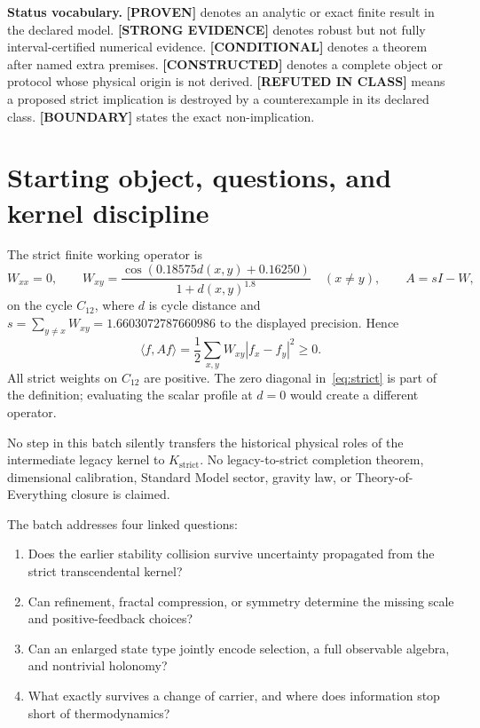 \documentclass[11pt,a4paper]{article}
\newcommand{\proven}{\textcolor{green!40!black}{\textbf{[PROVEN]}}}
\newcommand{\strong}{\textcolor{blue!70!black}{\textbf{[STRONG EVIDENCE]}}}
\newcommand{\conditional}{\textcolor{black!60}{\textbf{[CONDITIONAL]}}}
\newcommand{\constructed}{\textcolor{violet!70!black}{\textbf{[CONSTRUCTED]}}}
\newcommand{\failed}{\textcolor{red!72!black}{\textbf{[REFUTED IN CLASS]}}}
\newcommand{\statusboundary}{\textcolor{orange!80!black}{\textbf{[BOUNDARY]}}}
\begin{document}
\textbf{Status vocabulary.} \proven{} denotes an analytic or exact finite result in the declared model. \strong{} denotes robust but not fully interval-certified numerical evidence. \conditional{} denotes a theorem after named extra premises. \constructed{} denotes a complete object or protocol whose physical origin is not derived. \failed{} means a proposed strict implication is destroyed by a counterexample in its declared class. \statusboundary{} states the exact non-implication.

\tableofcontents
\newpage

\section{Starting object, questions, and kernel discipline}

The strict finite working operator is
\begin{equation}
W_{xx}=0,\qquad
W_{xy}=\frac{\cos(0.18575d(x,y)+0.16250)}{1+d(x,y)^{1.8}}\quad(x\ne y),
\qquad A=sI-W,
\label{eq:strict}
\end{equation}
on the cycle $C_{12}$, where $d$ is cycle distance and $s=\sum_{y\ne x}W_{xy}=1.6603072787660986$ to the displayed precision. Hence
\[
\langle f,Af\rangle=\frac12\sum_{x,y}W_{xy}|f_x-f_y|^2\ge0.
\]
All strict weights on $C_{12}$ are positive. The zero diagonal in~\eqref{eq:strict} is part of the definition; evaluating the scalar profile at $d=0$ would create a different operator.

No step in this batch silently transfers the historical physical roles of the intermediate legacy kernel to $K_{\mathrm{strict}}$. No legacy-to-strict completion theorem, dimensional calibration, Standard Model sector, gravity law, or Theory-of-Everything closure is claimed.

The batch addresses four linked questions:
\begin{enumerate}
\item Does the earlier stability collision survive uncertainty propagated from the strict transcendental kernel?
\item Can refinement, fractal compression, or symmetry determine the missing scale and positive-feedback choices?
\item Can an enlarged state type jointly encode selection, a full observable algebra, and nontrivial holonomy?
\item What exactly survives a change of carrier, and where does information stop short of thermodynamics?
\end{enumerate}
\end{document}
